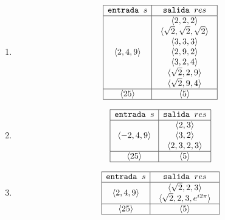 \documentclass[12pt,a4paper,spanish]{article}
\begin{document}
\begin{enumerate}[label=\alph*)]
	\item
	      \def\salidaLarga{
		      \begin{array}{c}
			      \secuencia{2, 2, 2}                      \\
			      \secuencia{\sqrt{2}, \sqrt{2}, \sqrt{2}} \\
			      \secuencia{3, 3, 3}                      \\
			      \secuencia{2,9, 2}                       \\
			      \secuencia{3, 2, 4}                      \\
			      \secuencia{\sqrt{2}, 2, 9}               \\
			      \secuencia{\sqrt{2},9, 4}                \\
		      \end{array}
	      }
	      \[
		      \begin{array}{|c|c|}
			      \hline
			      \texttt{entrada } s & \texttt{salida } res \\  \hline
			      \secuencia{2, 4, 9} & \salidaLarga         \\ \hline
			      \secuencia{25}      & \secuencia{5}        \\ \hline
		      \end{array}
	      \]

	\item

	      \def\salidaLarga{
		      \begin{array}{c}
			      \secuencia{2, 3}       \\
			      \secuencia{3, 2}       \\
			      \secuencia{2, 3, 2, 3} \\
		      \end{array}
	      }
	      \[
		      \begin{array}{|c|c|}
			      \hline
			      \texttt{entrada } s  & \texttt{salida } res \\  \hline
			      \secuencia{-2, 4, 9} & \salidaLarga         \\ \hline
			      \secuencia{25}       & \secuencia{5}        \\ \hline
		      \end{array}
	      \]

	\item

	      \def\salidaLarga{
		      \begin{array}{c}
			      \secuencia{\sqrt{2}, 2, 3}            \\
			      \secuencia{\sqrt{2}, 2, 3, e^{i2\pi}} \\
		      \end{array}
	      }
	      \[
		      \begin{array}{|c|c|}
			      \hline
			      \texttt{entrada } s & \texttt{salida } res \\  \hline
			      \secuencia{2, 4, 9} & \salidaLarga         \\ \hline
			      \secuencia{25}      & \secuencia{5}        \\ \hline
		      \end{array}
	      \]


\end{enumerate}
\end{document}
